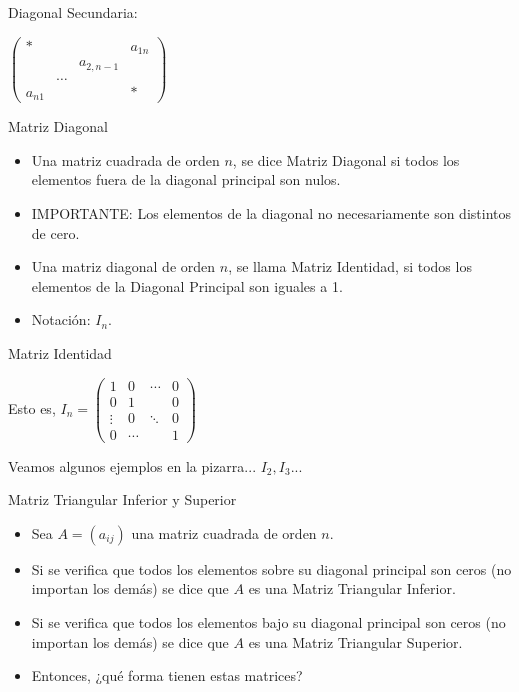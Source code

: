 Diagonal Secundaria:

$  \left(
\begin{array}{cccc}
  *             &              &                 &   a_{1n}      \\
                 &              & a_{2,n-1}  &            \\
                 & \ldots   &                 &            \\
a_{n1}      &              &                 & *
\end{array}
\right)$



{Matriz Diagonal}

\begin{itemize}
\item
Una matriz cuadrada de orden $n$, se dice Matriz Diagonal si todos los elementos fuera de la diagonal principal son nulos.

\item
IMPORTANTE:
Los elementos de la diagonal no necesariamente son distintos de cero.

\item
Una matriz diagonal de  orden $n$, se llama Matriz Identidad, si todos los elementos de la Diagonal Principal son iguales a 1.

\item
Notación: $I_n$.
\end{itemize}


{Matriz Identidad}

Esto es, 
$I_n =   \left(
\begin{array}{cccc}
1           &   0        &  \cdots    &     0\\
0           &   1        &                &     0 \\
\vdots   &   0           & \ddots  &      0 \\
0           &       \cdots      &       & 1
\end{array}
\right)$


Veamos algunos ejemplos en la pizarra... $I_2, I_3...$


{Matriz Triangular Inferior y Superior}

\begin{itemize}
\item
Sea $A = (a_{ij})$ una matriz cuadrada de orden $n$.

\item
Si se verifica que todos los elementos sobre su diagonal
principal son ceros (no importan los demás) se dice  que $A$ es una Matriz Triangular Inferior.

\item
Si se verifica que todos los elementos bajo su diagonal
principal son ceros (no importan los demás) se dice  que $A$ es una Matriz Triangular Superior.

\item
Entonces, ¿qué forma tienen estas matrices?
\end{itemize}


